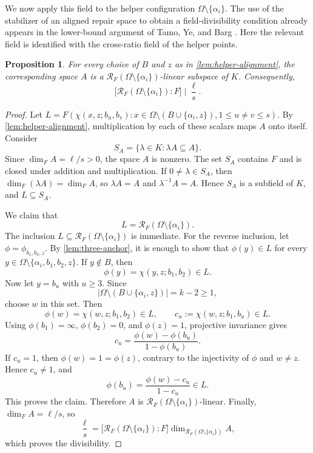 \documentclass[11pt,onecolumn]{IEEEtran}
\newtheorem{proposition}{Proposition}
\newcommand{\crf}{\mathscr R}
\begin{document}
We now apply this field to the helper configuration
$\Omega\setminus\{\alpha_i\}$.  The use of the stabilizer of an aligned
repair space to obtain a field-divisibility condition already appears
in the lower-bound argument of Tamo, Ye, and Barg
\cite[proof of Theorem~5]{TYB2017}.  Here the relevant field is identified
with the cross-ratio field of the helper points.

\begin{proposition}
\label{prop:helper-field-divides}
For every choice of $B$ and $z$ as in \cref{lem:helper-alignment}, the
corresponding space $A$ is a
$\crf_F(\Omega\setminus\{\alpha_i\})$-linear subspace of $K$.
Consequently,
\[
\bigl[\crf_F(\Omega\setminus\{\alpha_i\}):F\bigr]
\mid\frac{\ell}{s}.
\]
\end{proposition}

\begin{proof}
Let $L=F(\chi(x,z;b_u,b_v):
x\in\Omega\setminus(B\cup\{\alpha_i,z\}),
1 \leq u\ne v \leq s).
$
By \cref{lem:helper-alignment}, multiplication by each of these scalars
maps $A$ onto itself.  Consider
\[
S_A=\{\lambda\in K:\lambda A\subseteq A\}.
\]
Since $\dim_F A=\ell/s>0$, the space $A$ is nonzero.
The set $S_A$ contains $F$ and is closed under addition and
multiplication.  If $0\ne\lambda\in S_A$, then
$\dim_F(\lambda A)=\dim_F A$, so $\lambda A=A$ and
$\lambda^{-1}A=A$.  Hence $S_A$ is a subfield of $K$, and
$L\subseteq S_A$.

We claim that
\[
L=\crf_F(\Omega\setminus\{\alpha_i\}).
\]
The inclusion $L\subseteq\crf_F(\Omega\setminus\{\alpha_i\})$ is
immediate.  For the reverse inclusion, let
$\phi=\phi_{b_1,b_2,z}$.  By \cref{lem:three-anchor}, it is enough to
show that $\phi(y)\in L$ for every
$y\in\Omega\setminus\{\alpha_i,b_1,b_2,z\}$.  If $y\notin B$, then
\[
\phi(y)=\chi(y,z;b_1,b_2)\in L.
\]
Now let $y=b_u$ with $u\ge3$.  Since
\[
\bigl|\Omega\setminus(B\cup\{\alpha_i,z\})\bigr|=k-2\ge1,
\]
choose $w$ in this set.  Then
\[
\phi(w)=\chi(w,z;b_1,b_2)\in L,
\qquad
c_u:=\chi(w,z;b_1,b_u)\in L.
\]
Using
$\phi(b_1)=\infty$, $\phi(b_2)=0$, and $\phi(z)=1$, projective
invariance gives
\[
c_u
=
\frac{\phi(w)-\phi(b_u)}{1-\phi(b_u)}.
\]
If $c_u=1$, then $\phi(w)=1=\phi(z)$, contrary to the
injectivity of $\phi$ and $w\ne z$. Hence $c_u\ne1$, and
\[
\phi(b_u)=\frac{\phi(w)-c_u}{1-c_u}\in L.
\]
This proves the claim.  Therefore $A$ is
$\crf_F(\Omega\setminus\{\alpha_i\})$-linear.  Finally,
$\dim_F A=\ell/s$, so
\[
\frac{\ell}{s}
=
\bigl[\crf_F(\Omega\setminus\{\alpha_i\}):F\bigr]\dim_{\crf_F(\Omega\setminus\{\alpha_i\})}A,
\]
which proves the divisibility.
\end{proof}
\end{document}
